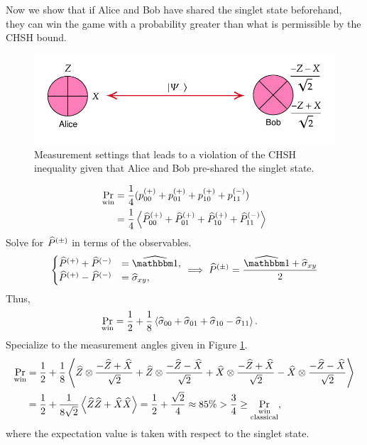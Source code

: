 Now we show that if Alice and Bob have shared the singlet state beforehand, they can win the game with a probability greater than what is permissible by the CHSH bound.
\begin{figure}[h]
	\centering
	\includegraphics[scale=0.75]{fig/chsh-measurement-setting}
	\caption{Measurement settings that leads to a violation of the CHSH inequality given that Alice and Bob pre-shared the singlet state.}
	\label{fig:chsh-setting}
\end{figure}
\begin{align}
	\Pr_{\textrm{win}} &= \frac{1}{4}(p_{00}^{(+)} + p_{01}^{(+)} + p_{10}^{(+)} + p_{11}^{(-)}) \\
	&= \frac{1}{4}\left\langle \widehat{P}_{00}^{(+)} + \widehat{P}_{01}^{(+)} + \widehat{P}_{10}^{(+)} + \widehat{P}_{11}^{(-)} \right\rangle
\end{align}
Solve for $\widehat{P}^{(\pm)}$ in terms of the observables.
\begin{align}
	\begin{cases}
		\op P^{(+)} + \op P^{(-)} &= \op \id, \\
		 \op P^{(+)} - \op P^{(-)} &= \op \sigma_{xy},
	\end{cases}
	\implies \op P^{(\pm)} = \frac{\op\id + \op\sigma_{xy}}{2}
\end{align}
Thus,
\begin{align}
	\Pr_{\textrm{win}} &= 
	\frac{1}{2} + \frac{1}{8}\left\langle \widehat{\sigma}_{00} + \widehat{\sigma}_{01} + \widehat{\sigma}_{10}  - \widehat{\sigma}_{11} \right\rangle. 
\end{align}
Specialize to the measurement angles given in Figure \ref{fig:chsh-setting}.
\begin{align}
\Pr_{\textrm{win}} &=   \frac{1}{2} + 
	\frac{1}{8}\left\langle \widehat{Z}\otimes \frac{-\widehat{Z} + \widehat{X}}{\sqrt 2} 
	+ \widehat{Z}\otimes \frac{-\widehat{Z} - \widehat{X}}{\sqrt 2}
	+ \widehat{X}\otimes \frac{-\widehat{Z} + \widehat{X}}{\sqrt 2}
	- \widehat{X}\otimes \frac{-\widehat{Z} - \widehat{X}}{\sqrt 2} \right\rangle \\
	&=  \frac{1}{2} + 
	\frac{1}{8\sqrt 2} \left\langle \widehat{Z}\widehat{Z} + \widehat{X} \widehat{X} \right\rangle = \frac{1}{2} + \frac{\sqrt 2}{4} \approx 85\% >
	\frac{3}{4} \ge \Pr_{\substack{\textrm{win}\\ \textrm{classical}}},
\end{align}
where the expectation value is taken with respect to the singlet state.

